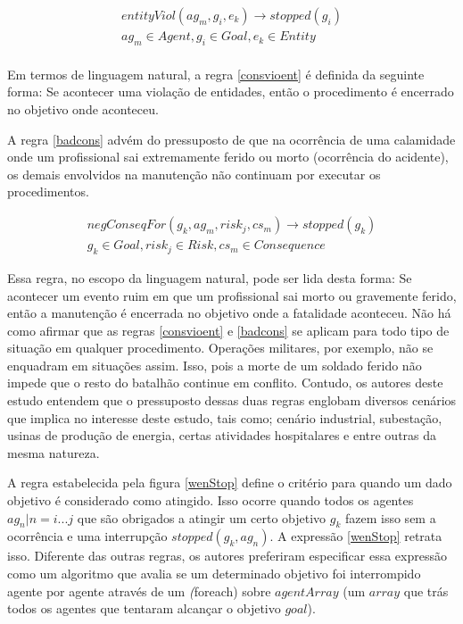 \begin{eqnarray}\label{consvioent}
	entityViol(ag_m,g_i,e_k) \to stopped(g_i) \nonumber \\  
    ag_m \in Agent, g_i \in Goal, e_k \in Entity \\ \nonumber
\end{eqnarray}

Em termos de linguagem natural, a regra \ref{consvioent} é definida da seguinte forma: Se acontecer uma violação de entidades, então o procedimento é encerrado no objetivo onde aconteceu. 

A regra \ref{badcons} advém do pressuposto de que na ocorrência de uma calamidade onde um profissional sai extremamente ferido ou morto (ocorrência do acidente), os demais envolvidos na manutenção não continuam por executar os procedimentos. 
 
 \begin{eqnarray}\label{badcons}
	negConseqFor(g_k,ag_m,risk_j,cs_m) \to stopped(g_k) \nonumber \\ 
    g_k \in Goal, risk_j \in Risk, cs_m \in Consequence
\end{eqnarray}

Essa regra, no escopo da linguagem natural, pode ser lida desta forma: Se acontecer um evento ruim em que um profissional sai morto ou gravemente ferido, então a manutenção é encerrada no objetivo onde a fatalidade aconteceu. Não há como afirmar que as regras  \ref{consvioent} e \ref{badcons} se aplicam para todo tipo de situação em qualquer procedimento. Operações militares, por exemplo, não se enquadram em situações assim. Isso, pois a morte de um soldado ferido não impede que o resto do batalhão continue em conflito. Contudo, os autores deste estudo entendem que o pressuposto dessas duas regras englobam diversos cenários que implica no interesse deste estudo, tais como; cenário industrial, subestação, usinas de produção de energia, certas atividades hospitalares e entre outras da mesma natureza.  

A regra estabelecida pela figura \ref{wenStop} define o critério para quando um dado objetivo é considerado como atingido. Isso ocorre quando todos os agentes $ag_n | n = i ... j$ que são obrigados a atingir um certo objetivo $ g_k $ fazem isso sem a ocorrência e uma interrupção $stopped(g_k,ag_n)$. A expressão \ref{wenStop} retrata isso. Diferente das outras regras, os autores preferiram especificar essa expressão como um algoritmo que avalia se um determinado objetivo foi interrompido agente por agente através de um \textit(foreach) sobre $agentArray$ (um $array$ que trás todos os agentes que tentaram alcançar o objetivo $goal$). 

